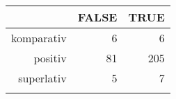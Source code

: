 \begin{tabular}{rrr}
  \lsptoprule
 & FALSE & TRUE \\ 
  \midrule
komparativ & 6 & 6 \\ 
  positiv & 81 & 205 \\ 
  superlativ & 5 & 7 \\ 
   \lspbottomrule
\end{tabular}
